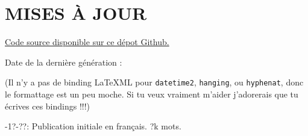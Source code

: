\documentclass{article}
\begin{document}
\section*{MISES À JOUR}

\noindent \href{https://github.com/Juicysteak117/pghrt/}{Code source disponible sur ce dépot Github.}

\noindent Date de la dernière génération : \DTMnow

\noindent(Il n'y a pas de binding LaTeXML pour \texttt{datetime2}, \texttt{hanging}, ou \texttt{hyphenat}, donc le formattage est un peu moche. Si tu veux vraiment m'aider j'adorerais que tu écrives ces bindings !!!)

-1?-??: Publication initiale en français. ?k mots.
\end{document}
